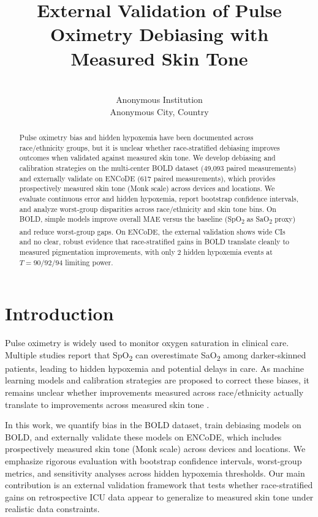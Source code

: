 \documentclass[pmlr]{jmlr}%
\title[Pulse Oximetry Bias]{External Validation of Pulse Oximetry Debiasing with Measured Skin Tone}
\author{\Name{Anonymous Author(s)}
       \Email{anonymous@domain.edu}\\
       \addr Anonymous Institution\\
       Anonymous City, Country}
\begin{document}
\maketitle

\begin{abstract}
Pulse oximetry bias and hidden hypoxemia have been documented across race/ethnicity groups, but it is unclear whether race-stratified debiasing improves outcomes when validated against measured skin tone. We develop debiasing and calibration strategies on the multi-center BOLD dataset (49,093 paired measurements) and externally validate on ENCoDE (617 paired measurements), which provides prospectively measured skin tone (Monk scale) across devices and locations. We evaluate continuous error and hidden hypoxemia, report bootstrap confidence intervals, and analyze worst-group disparities across race/ethnicity and skin tone bins. On BOLD, simple models improve overall MAE versus the baseline (SpO\textsubscript{2} as SaO\textsubscript{2} proxy) and reduce worst-group gaps. On ENCoDE, the external validation shows wide CIs and no clear, robust evidence that race-stratified gains in BOLD translate cleanly to measured pigmentation improvements, with only 2 hidden hypoxemia events at $T=90/92/94$ limiting power.
\end{abstract}

\section{Introduction}

Pulse oximetry is widely used to monitor oxygen saturation in clinical care. Multiple studies report that SpO\textsubscript{2} can overestimate SaO\textsubscript{2} among darker-skinned patients, leading to hidden hypoxemia and potential delays in care.
As machine learning models and calibration strategies are proposed to correct these biases, it remains unclear whether improvements measured across race/ethnicity actually translate to improvements across measured skin tone \cite{sjoding2020racial,wong2021discrepancies,encode2024}.

In this work, we quantify bias in the BOLD dataset, train debiasing models on BOLD, and externally validate these models on ENCoDE, which includes prospectively measured skin tone (Monk scale) across devices and locations. We emphasize rigorous evaluation with bootstrap confidence intervals, worst-group metrics, and sensitivity analyses across hidden hypoxemia thresholds. Our main contribution is an external validation framework that tests whether race-stratified gains on retrospective ICU data appear to generalize to measured skin tone under realistic data constraints.
\end{document}
